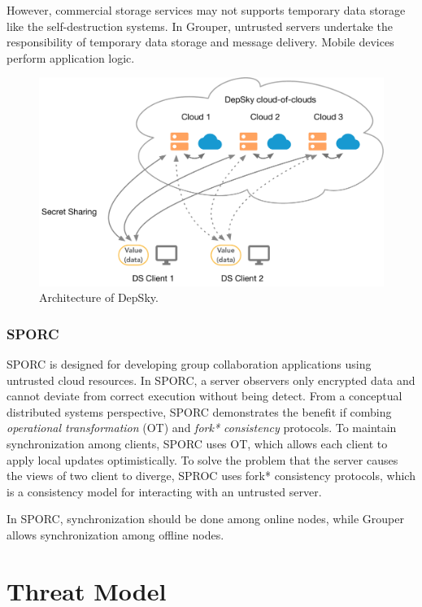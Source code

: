 \documentclass[a4paper,11pt]{report}
\begin{document}
However, commercial storage services may not supports temporary data storage like the self-destruction systems.
In Grouper, untrusted servers undertake the responsibility of temporary data storage and message delivery.
Mobile devices perform application logic.

\begin{figure}
	\centering
	\includegraphics[scale=0.6]{depsky}
	\caption{Architecture of DepSky.}
	\label{fig:depsky}
\end{figure}

\subsection{SPORC}

SPORC\cite{feldman2010sporc} is designed for developing group collaboration applications using untrusted cloud resources.
In SPORC, a server observers only encrypted data and cannot deviate from correct execution without being detect.
From a conceptual distributed systems perspective, SPORC demonstrates the benefit if combing \emph{operational transformation} (OT)\cite{ellis1989concurrency} and \emph{fork* consistency}  protocols\cite{li2007beyond}.
To maintain synchronization among clients, SPORC uses OT, which allows each client to apply local updates optimistically.
To solve the problem that the server causes the views of two client to diverge, SPROC uses fork* consistency protocols, which is a consistency model for interacting with an untrusted server.

In SPORC, synchronization should be done among online nodes, while Grouper allows synchronization among offline nodes.

\chapter{Threat Model} \label{chapter:threat_model}
\end{document}
